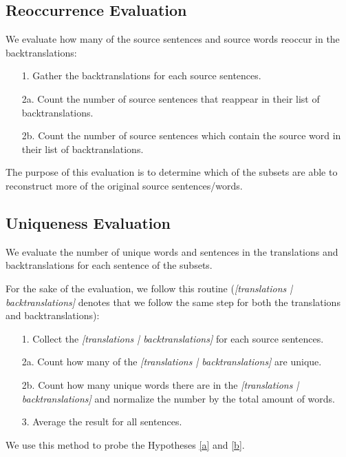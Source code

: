 \subsection{Reoccurrence Evaluation}
\label{sec:Base_Experiment:Statistics:Reoccurrence}
We evaluate how many of the source sentences and source words reoccur in the backtranslations:

\begin{enumerate}
    \item[1. ] Gather the backtranslations for each source sentences.
    \item[2a. ] Count the number of source sentences that reappear in their list of backtranslations.
    \item[2b. ] Count the number of source sentences which contain the source word in their list of backtranslations.
\end{enumerate}

The purpose of this evaluation is to determine which of the subsets are able to reconstruct more of the original source sentences/words.

\subsection{Uniqueness Evaluation}
\label{sec:Base_Experiment:Statistics:Uniqueness}
We evaluate the number of unique words and sentences in the translations and backtranslations for each sentence of the subsets. 

For the sake of the evaluation, we follow this routine (\textit{[translations | backtranslations]} denotes that we follow the same step for both the translations and backtranslations):
\begin{enumerate}
    \item[1. ] Collect the \textit{[translations | backtranslations]} for each source sentences.
    \item[2a. ] Count how many of the \textit{[translations | backtranslations]} are unique. 
    \item[2b. ] Count how many unique words there are in the \textit{[translations | backtranslations]} and normalize the number by the total amount of words. 
    \item[3. ] Average the result for all sentences.
\end{enumerate}

We use this method to probe the Hypotheses \ref{a} and \ref{b}. 


